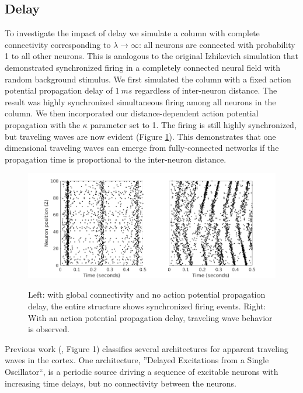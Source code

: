 \documentclass[a4paper,11pt]{article}
\begin{document}
\subsection{Delay} \label{sub:delay}
To investigate the impact of delay we simulate a column with complete connectivity corresponding to $\lambda \rightarrow \infty$: all neurons are connected with probability 1 to all other neurons.
This is analogous to the original Izhikevich simulation \cite{izzy_code} that demonstrated synchronized firing in a completely connected neural field with random background stimulus.
We first simulated the column with a fixed action potential propagation delay of $1~ms$ regardless of inter-neuron distance.
The result was highly synchronized simultaneous firing among all neurons in the column.
We then incorporated our distance-dependent action potential propagation with the $\kappa$ parameter set to 1.
The firing is still highly synchronized, but traveling waves are now evident (Figure \ref{fig:delay_waves}).
This demonstrates that one dimensional traveling waves can emerge from fully-connected networks if the propagation time is proportional to the inter-neuron distance.
\begin{figure}[!ht]
 \caption{Left: with global connectivity and no action potential propagation delay, the entire structure shows synchronized firing events. Right: With an action potential propagation delay, traveling wave behavior is observed.}
 \centering
   \includegraphics[width=\textwidth]{fig/DelayWaves}  
 \label{fig:delay_waves}
\end{figure}
Previous work (\cite{ermentrout2001}, Figure 1) classifies several architectures for apparent traveling waves in the cortex.
One architecture, ''Delayed Excitations from a Single Oscillator``, is a periodic source driving a sequence of excitable neurons with increasing time delays, but no connectivity between the neurons.

\FloatBarrier
\end{document}

